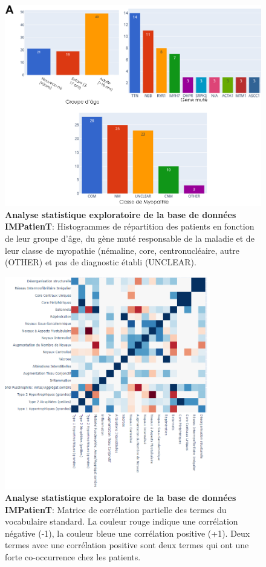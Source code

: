 \begin{figure}[!ht]
  \centering
  \includegraphics[width=1\textwidth]{figures/impatient_explo.png}
  \caption[Analyse statistique exploratoire IMPatienT (histogrammes)]{\textbf{Analyse statistique exploratoire de la base de données IMPatienT}: Histogrammes de répartition des patients en fonction de leur groupe d'âge, du gène muté responsable de la maladie et de leur classe de myopathie (némaline, core, centronucléaire, autre (OTHER) et pas de diagnostic établi (UNCLEAR).}
  \label{fig:impatient_eda}
\end{figure}
\begin{figure}[!ht]
  \centering
  \includegraphics[width=0.8\textwidth]{figures/impatient_explo2.png}
  \caption[Analyse statistique exploratoire IMPatienT (matrice)]{\textbf{Analyse statistique exploratoire de la base de données IMPatienT}: Matrice de corrélation partielle des termes du vocabulaire standard. La couleur rouge indique une corrélation négative (-1), la couleur bleue une corrélation positive (+1). Deux termes avec une corrélation positive sont deux termes qui ont une forte co-occurrence chez les patients.}
  \label{fig:impatient_eda2}
\end{figure}

